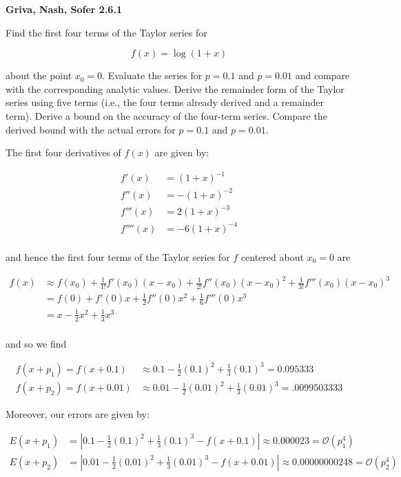 \textbf{Griva, Nash, Sofer 2.6.1}

Find the first four terms of the Taylor series for 

$$
  f(x) = \log{(1 + x)}
$$

about the point $x_0 = 0$. Evaluate the series for $p = 0.1$ and $p = 0.01$ and compare 
with the corresponding analytic values. Derive the remainder form of the Taylor series 
using five terms (i.e., the four terms already derived and a remainder term). Derive
a bound on the accuracy of the four-term series. Compare the derived bound with the
actual errors for $p = 0.1$ and $p = 0.01$.

\begin{solution}
  The first four derivatives of $f(x)$ are given by:

  \begin{align*}
    f'(x) &= (1 + x)^{-1} \\
    f''(x) &= -(1 + x)^{-2} \\
    f'''(x) &= 2(1 + x)^{-3} \\
    f''''(x) &= -6(1 + x)^{-4} \\
  \end{align*}

  and hence the first four terms of the Taylor series for $f$ centered about $x_0 = 0$ are

  \begin{align*}
    f(x) &\approx f(x_0) + \frac{1}{1!} f'(x_0)(x - x_0) + \frac{1}{2!} f''(x_0)(x - x_0)^2 + \frac{1}{3!} f'''(x_0)(x - x_0)^3 \\
         &= f(0) + f'(0) x + \frac{1}{2} f''(0) x^2 + \frac{1}{6} f'''(0) x^3 \\
         &= x - \frac{1}{2} x^2 + \frac{1}{3} x^3 \\
  \end{align*}

  and so we find

  \begin{align*}
    f(x + p_1) = f(x + 0.1)  &\approx 0.1 - \frac{1}{2} (0.1)^2 + \frac{1}{3} (0.1)^3 = 0.095333 \\
    f(x + p_2) = f(x + 0.01) &\approx 0.01 - \frac{1}{2} (0.01)^2 + \frac{1}{3} (0.01)^3 = .0099503333
  \end{align*}

  Moreover, our errors are given by:

  \begin{align*}
    E(x + p_1) &= \left\vert 0.1 - \frac{1}{2} (0.1)^2 + \frac{1}{3} (0.1)^3 - f(x + 0.1) \right\vert \approx 0.000023 = \mathcal{O}(p_1^4) \\
    E(x + p_2) &= \left\vert 0.01 - \frac{1}{2} (0.01)^2 + \frac{1}{3} (0.01)^3 - f(x + 0.01) \right\vert \approx 0.00000000248 = \mathcal{O}(p_2^4) \\
  \end{align*}


\end{solution}
